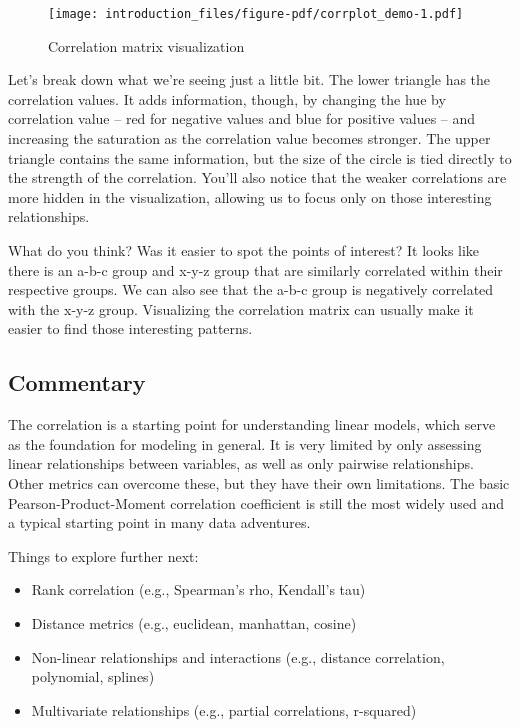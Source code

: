 \documentclass[
  letterpaper,
]{krantz}
\providecommand{\tightlist}{%
  \setlength{\itemsep}{0pt}\setlength{\parskip}{0pt}}\usepackage{longtable,booktabs,array}
\begin{document}
\begin{figure}

{\centering \texttt{[image: introduction\_files/figure-pdf/corrplot\_demo-1.pdf]}

}

\caption{Correlation matrix visualization}

\end{figure}

Let's break down what we're seeing just a little bit. The lower triangle
has the correlation values. It adds information, though, by changing the
hue by correlation value -- red for negative values and blue for
positive values -- and increasing the saturation as the correlation
value becomes stronger. The upper triangle contains the same
information, but the size of the circle is tied directly to the strength
of the correlation. You'll also notice that the weaker correlations are
more hidden in the visualization, allowing us to focus only on those
interesting relationships.

What do you think? Was it easier to spot the points of interest? It
looks like there is an a-b-c group and x-y-z group that are similarly
correlated within their respective groups. We can also see that the
a-b-c group is negatively correlated with the x-y-z group. Visualizing
the correlation matrix can usually make it easier to find those
interesting patterns.

\subsection{Commentary}\label{commentary}

The correlation is a starting point for understanding linear models,
which serve as the foundation for modeling in general. It is very
limited by only assessing linear relationships between variables, as
well as only pairwise relationships. Other metrics can overcome these,
but they have their own limitations. The basic Pearson-Product-Moment
correlation coefficient is still the most widely used and a typical
starting point in many data adventures.

Things to explore further next:

\begin{itemize}
\tightlist
\item
  Rank correlation (e.g., Spearman's rho, Kendall's tau)
\item
  Distance metrics (e.g., euclidean, manhattan, cosine)
\item
  Non-linear relationships and interactions (e.g., distance correlation,
  polynomial, splines)
\item
  Multivariate relationships (e.g., partial correlations, r-squared)
\end{itemize}
\end{document}
